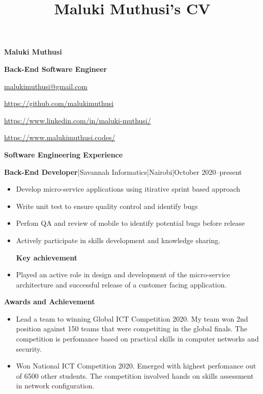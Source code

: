 \documentclass[a4paper]{article}
\begin{document}
\title{Maluki Muthusi's CV}

\begin{center}
    {\Large \textbf{Maluki Muthusi}} \par
    {\large \textbf{Back-End Software Engineer}}
\end{center}

\begin{description}[noitemsep]
    \item[\textbf{Email:}] \href{mailto:malukimuthusi@gmail.com}{malukimuthusi@gmail.com}
    \item[\textbf{Github:}] \url{https://github.com/malukimuthusi}
    \item[\textbf{LinkedIn:}]\url{https://www.linkedin.com/in/maluki-muthusi/}
    \item[\textbf{Website:}]\url{https://www.malukimuthusi.codes/}
\end{description}







\begin{center}
    {\Large \textbf{Software Engineering Experience}}
\end{center}
\textbf{Back-End Developer}|Savannah Informatics|Nairobi|October 2020--present
\begin{itemize}[noitemsep]
    \item Develop micro-service applications using itirative sprint based approach
    \item Write unit test to ensure quality control and identify bugs
    \item Perfom QA and review of mobile to identify potential bugs before release
    \item Actively participate in skills development and knowledge sharing.
          \begin{center}
              \textbf{Key achievement}
          \end{center}
    \item Played an active role in design and development of the micro-service architecture and successful release of a customer facing application.
\end{itemize}

\begin{center}
    {\Large \textbf{Awards and Achievement}}
\end{center}
\begin{itemize}[noitemsep]
    \item Lead a team to winning Global ICT Competition 2020. My team won 2nd position against 150 teams that were competiting in the global finals. The competition is perfomance based on practical skills in computer networks and security.
    \item Won National ICT Competition 2020. Emerged with highest perfomance out of 6500 other students. The competition involved hands on skills assessment in network configuration.
\end{itemize}
\end{document}
